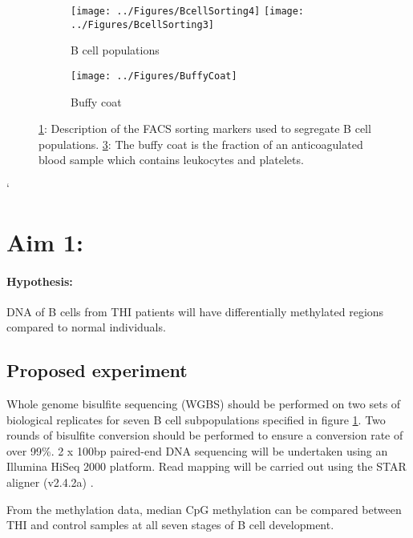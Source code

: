 \documentclass[12pt]{article}
\begin{document}
			
			
				\begin{figure}[tb]
					\centering
					\begin{subfigure}[b]{.7\textwidth}
						\flushleft
						\texttt{[image: ../Figures/BcellSorting4]}
						\texttt{[image: ../Figures/BcellSorting3]}
						\caption{B cell populations}
						\label{fig:BCellSorting}
					\end{subfigure}
					\begin{subfigure}[b]{0.29\textwidth}
						\centering
						\texttt{[image: ../Figures/BuffyCoat]}
						\caption{Buffy coat}
						\label{fig:BuffyCoat}
					\end{subfigure}
					\caption{\ref{fig:BCellSorting}: Description of the FACS sorting markers used to segregate B cell populations. \ref{fig:BuffyCoat}: The buffy coat is the fraction of an anticoagulated blood sample which contains leukocytes and platelets.}
				\end{figure}`
	
	\section{Aim 1:}
		
		\paragraph{Hypothesis:} DNA of B cells from THI patients will have differentially methylated regions compared to normal individuals.
		
		\subsection{Proposed experiment}
			
			Whole genome bisulfite sequencing (WGBS) should be performed on two sets of biological replicates for seven B cell subpopulations specified in figure \ref{fig:BCellSorting}. 
			Two rounds of bisulfite conversion should be performed to ensure a conversion rate of over 99\%.
			2 x 100bp paired-end DNA sequencing will be undertaken using an Illumina HiSeq 2000 platform. 
			Read mapping will be carried out using the STAR aligner (v2.4.2a) \citep{Dobin13}.
			
			From the methylation data, median CpG methylation can be compared between THI and control samples at all seven stages of B cell development. 
			
\end{document}
